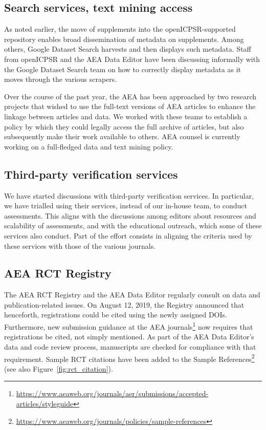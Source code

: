 \documentclass[PP]{AEA}
\newcommand{\urlcite}[2]{#2\footnote{\url{#1}}}
\begin{document}
\subsection{Search services, text mining access}
As noted earlier, the move of supplements into the openICPSR-supported repository enables broad dissemination of metadata on supplements. Among others, Google Dataset Search harvests and then displays such metadata. Staff from openICPSR and the AEA Data Editor have been discussing informally with the Google Dataset Search team on how to correctly display metadata as it moves through the various scrapers. 

Over the course of the past year, the AEA has been approached by two research projects that wished to use the full-text versions of AEA articles to enhance the linkage between articles and data. We worked with these teams to establish a policy by which they could legally access the full archive of articles, but also subsequently make their work available to others. AEA counsel is currently working on a full-fledged data and text mining policy.

\subsection{Third-party verification services}
We have started discussions with third-party verification services. In particular, we have trialled using their services, instead of our in-house team, to conduct assessments. This aligns with the discussions among editors about resources and scalability of assessments, and with the educational outreach, which some of these services also conduct. Part of the effort consists in aligning the criteria used by these services with those of the various journals.


\subsection{AEA RCT Registry}

The AEA RCT Registry and the AEA Data Editor regularly consult on data and publication-related issues. On August 12, 2019, the Registry announced that henceforth, registrations could be cited using the newly assigned \acp{DOI}. Furthermore, new \urlcite{https://www.aeaweb.org/journals/aer/submissions/accepted-articles/styleguide}{submission guidance at the AEA journals} now requires that registrations be cited, not simply mentioned. As part of the AEA Data Editor's data and code review process, manuscripts are checked for compliance with that requirement. Sample RCT citations have been added to the \urlcite{https://www.aeaweb.org/journals/policies/sample-references}{Sample References} (see also Figure~\ref{fig:rct_citation}).
\end{document}
